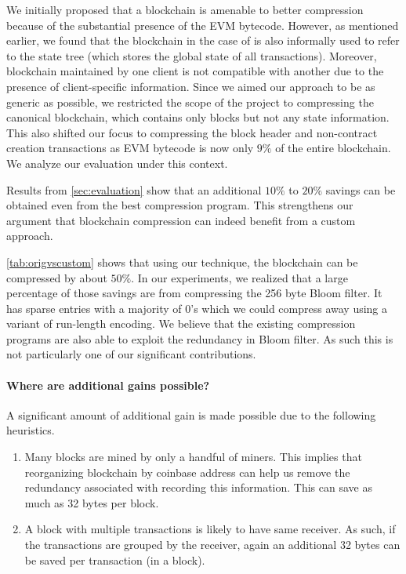 We initially proposed that a blockchain is amenable to better compression because of the substantial presence of the EVM bytecode.
However, as mentioned earlier, we found that the blockchain in the case of \eth{} is also informally used to refer to the state tree (which stores the global state of all transactions).
Moreover, blockchain maintained by one \eth{} client is not compatible with another due to the presence of client-specific information.
Since we aimed our approach to be as generic as possible, we restricted the scope of the project to compressing the canonical blockchain, which contains only blocks but not any state information. 
This also shifted our focus to  compressing the block header and non-contract creation transactions as EVM bytecode is now only $9\%$ of the entire blockchain.
We analyze our evaluation under this context.

Results from \autoref{sec:evaluation} show that an additional $10\%$ to $20\%$ savings can be obtained even from the best compression program.
This strengthens our argument that 
blockchain compression can indeed benefit from a custom approach.

\autoref{tab:origvscustom} shows that using our technique, the blockchain can be compressed by about $50\%$.
In our experiments, we realized that a large percentage of those savings
are from compressing the 256 byte Bloom filter.
It has sparse entries with a majority of 0's which we could compress
away using a variant of run-length encoding.
We believe that the existing compression programs are also able to exploit
the redundancy in Bloom filter. As such this is not particularly one of 
our significant contributions.

\paragraph{Where are additional gains possible?}
A significant amount of additional gain is made possible due to the following 
heuristics.
\begin{enumerate}
\item Many blocks are mined by only a handful of miners. This implies that reorganizing blockchain by coinbase address can help us remove the redundancy associated with recording this information. This can save as much as 32 bytes per block.

\item A block with multiple transactions is likely to have same receiver. As such, if the transactions are grouped by the receiver, again an additional 32 bytes can be saved per transaction (in a block).
\end{enumerate}

